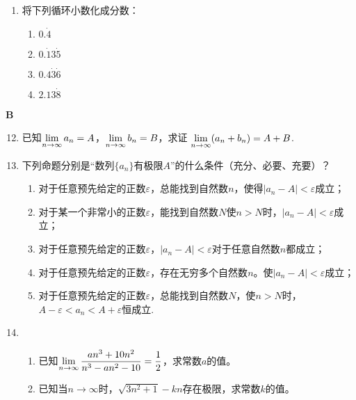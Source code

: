 \begin{enumerate}
\item 将下列循环小数化成分数：
\begin{multicols}{4}
\begin{enumerate}[(1)]
    \item $0.\dot{4}$
    \item $0.\dot{1}3\dot{5}$
    \item $0.4\dot{3}\dot{6}$
    \item $2.13\dot{8}$
\end{enumerate}
\end{multicols}



\end{enumerate}

\begin{center}
    \bfseries B
\end{center}

\begin{enumerate}\setcounter{enumi}{11}
    \item 已知$\lim\limits_{n\to \infty}a_n=A$，$\lim\limits_{n\to \infty}b_n=B$，求证
$\lim\limits_{n\to \infty}(a_n+b_n)=A+B$.

\item 下列命题分别是“数列$\{a_n\}$有极限$A$”的什么条件（充分、必要、充要）？
\begin{enumerate}[(1)]
\item 对于任意预先给定的正数$\varepsilon$，总能找到自然数$n$，使得$|a_n-A|<\varepsilon$成立；
\item 对于某一个非常小的正数$\varepsilon$，能找到自然数$N$使$n>N$时，$|a_n-A|<\varepsilon$成立；
\item 对于任意预先给定的正数$\varepsilon$，$|a_n-A|<\varepsilon$对于任意自然数$n$都成立；
\item 对于任意预先给定的正数$\varepsilon$，存在无穷多个自然数$n$。使$|a_n-A|<\varepsilon$成立；
\item 对于任意预先给定的正数$\varepsilon$，总能找到自然数$N$，使$n>N$时，$A-\varepsilon<a_n<A+\varepsilon$恒成立.
\end{enumerate}

\item \begin{enumerate}[(1)]
    \item 已知$\lim\limits_{n\to \infty}\dfrac{an^3+10n^2}{n^3-an^2-10}=\dfrac{1}{2}$，求常数$a$的值。
    \item   已知当$n\to\infty$时，$\sqrt{3n^2+1}-kn$存在极限，求常数$k$的值。
\end{enumerate}
\end{enumerate}



